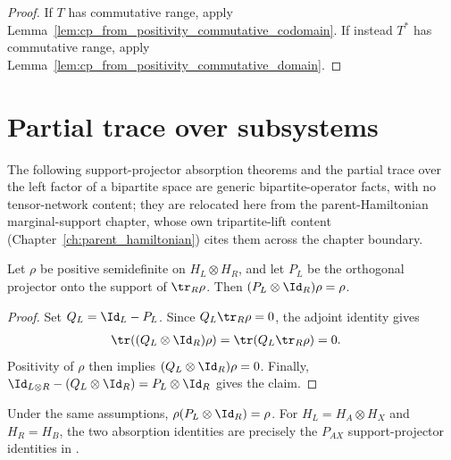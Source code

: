 \begin{proof}\leanok
    If $T$ has commutative range, apply
    Lemma~\ref{lem:cp_from_positivity_commutative_codomain}. If instead
    $T^*$ has commutative range, apply
    Lemma~\ref{lem:cp_from_positivity_commutative_domain}.
\end{proof}

\section{Partial trace over subsystems}

The following support-projector absorption theorems and the partial trace
over the left factor of a bipartite space are generic bipartite-operator
facts, with no tensor-network content; they are relocated here from the
parent-Hamiltonian marginal-support chapter, whose own tripartite-lift
content (Chapter~\ref{ch:parent_hamiltonian}) cites them across the chapter
boundary.

\begin{theorem}
    \label{thm:marginal_support_left_absorption}
    \leanok
    Let $\rho$ be positive semidefinite on $H_L\otimes H_R$, and let $P_L$ be
    the orthogonal projector onto the support of $\tr_R\rho$. Then
    $(P_L\otimes\Id_R)\rho=\rho$.
\end{theorem}

\begin{proof}
    \leanok
    Set $Q_L=\Id_L-P_L$. Since $Q_L\tr_R\rho=0$, the adjoint identity gives
    \begin{align}
        \tr((Q_L\otimes\Id_R)\rho)
        &=\tr(Q_L\tr_R\rho) =0.
        \notag
    \end{align}
    Positivity of $\rho$ then implies
    $(Q_L\otimes\Id_R)\rho=0$. Finally,
    $\Id_{L\otimes R}-(Q_L\otimes\Id_R)=P_L\otimes\Id_R$ gives the claim.
\end{proof}

\begin{theorem}
    \label{thm:marginal_support_right_absorption}
    \leanok
    Under the same assumptions,
    $\rho(P_L\otimes\Id_R)=\rho$.
    For $H_L=H_A\otimes H_X$ and $H_R=H_B$, the two absorption identities are
    precisely the $P_{AX}$ support-projector identities in
    \cite[Appendix~D.2, lines 2228--2235]{Cirac2016MPDO_arXiv}.
\end{theorem}

